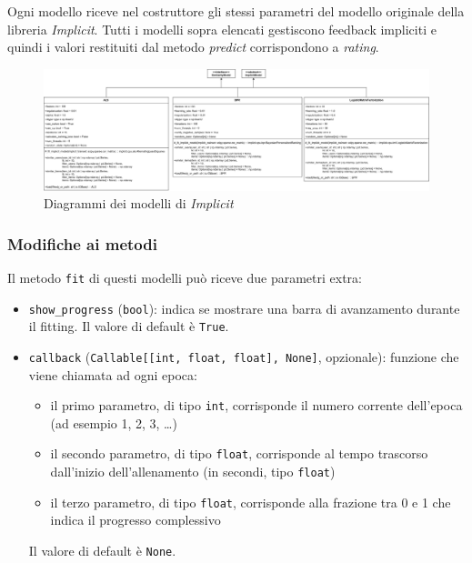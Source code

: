 Ogni modello riceve nel costruttore gli stessi parametri del modello originale della libreria \textit{Implicit}. Tutti i modelli sopra elencati gestiscono feedback impliciti e quindi i valori restituiti dal metodo \textit{predict} corrispondono a \textit{rating}.

\begin{figure}[htbp]
    \centering
    \includegraphics[angle=90, scale=0.1]{figures/UML/models/implicit_similarity_models.png}
    \caption{Diagrammi dei modelli di \textit{Implicit}}
\end{figure}

\subsubsection{Modifiche ai metodi}

Il metodo \texttt{fit} di questi modelli può riceve due parametri extra:

\begin{itemize}
    \item \texttt{show\_progress} (\texttt{bool}): indica se mostrare una barra di avanzamento durante il fitting. Il valore di default è \texttt{True}.
    \item \texttt{callback} (\texttt{Callable[[int, float, float], None]}, opzionale): funzione che viene chiamata ad ogni epoca:
    \begin{itemize}
        \item il primo parametro, di tipo \texttt{int}, corrisponde il numero corrente dell'epoca (ad esempio 1, 2, 3, \ldots)
        \item il secondo parametro, di tipo \texttt{float}, corrisponde al tempo trascorso dall'inizio dell'allenamento (in secondi, tipo \texttt{float})
        \item il terzo parametro, di tipo \texttt{float}, corrisponde alla frazione tra 0 e 1 che indica il progresso complessivo
    \end{itemize}
    Il valore di default è \texttt{None}.
\end{itemize}

